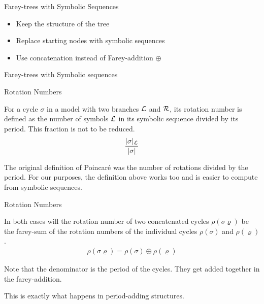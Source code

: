 \begin{frame}{Farey-trees with Symbolic Sequences}
	\begin{itemize}
		\item Keep the structure of the tree
		\item Replace starting nodes with symbolic sequences
		\item Use concatenation instead of Farey-addition $\oplus$
	\end{itemize}
\end{frame}

\begin{frame}{Farey-trees with Symbolic sequences}
	\begin{figure}
	\end{figure}
\end{frame}

\begin{frame}{Rotation Numbers}
	\vspace{-1em}
	\begin{definition}
		For a cycle $\sigma$ in a model with two branches $\mathcal{L}$ and $\mathcal{R}$, its rotation number is defined as the number of symbols $\mathcal{L}$ in its symbolic sequence divided by its period.
		This fraction is not to be reduced.
		\begin{align*}
			\dfrac{|\sigma|_{\mathcal{L}}}{|\sigma|}
		\end{align*}
	\end{definition}
	\pause
	\begin{definition}
		The original definition of Poincaré was the number of rotations divided by the period.
		For our purposes, the definition above works too and is easier to compute from symbolic sequences.
	\end{definition}
\end{frame}

\begin{frame}{Rotation Numbers}
	\begin{theorem}
		In both cases will the rotation number of two concatenated cycles $\rho(\sigma\varrho)$ be the farey-sum of the rotation numbers of the individual cycles $\rho(\sigma)$ and $\rho(\varrho)$.
		\begin{align*}
			\rho(\sigma\varrho) = \rho(\sigma) \oplus \rho(\varrho)
		\end{align*}
	\end{theorem}
	\pause
	Note that the denominator is the period of the cycles.
	They get added together in the farey-addition.

	\vspace{1em}
	\pause
	This is exactly what happens in period-adding structures.
\end{frame}

